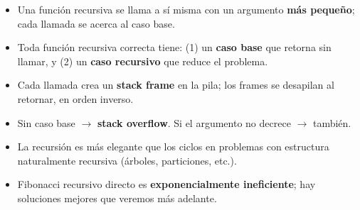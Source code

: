 \documentclass[12pt, oneside]{article}
\begin{document}
\begin{recuerda}
\begin{itemize}
  \item Una función recursiva se llama a sí misma con un argumento
        \textbf{más pequeño}; cada llamada se acerca al caso base.
  \item Toda función recursiva correcta tiene:
        (1) un \textbf{caso base} que retorna sin llamar, y
        (2) un \textbf{caso recursivo} que reduce el problema.
  \item Cada llamada crea un \textbf{stack frame} en la pila;
        los frames se desapilan al retornar, en orden inverso.
  \item Sin caso base $\rightarrow$ \textbf{stack overflow}.
        Si el argumento no decrece $\rightarrow$ también.
  \item La recursión es más elegante que los ciclos en problemas con
        estructura naturalmente recursiva (árboles, particiones, etc.).
  \item Fibonacci recursivo directo es \textbf{exponencialmente ineficiente};
        hay soluciones mejores que veremos más adelante.
\end{itemize}
\end{recuerda}
\end{document}
